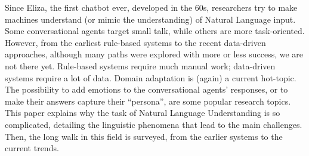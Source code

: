 
Since Eliza, the first chatbot ever, developed in the 60s, researchers try to make machines understand (or mimic the understanding) of Natural Language input. Some conversational agents target small talk, while others are more task-oriented. However, from the earliest rule-based systems to the recent data-driven approaches, although many paths were explored with more or less success, we are not there yet. Rule-based systems require much manual work; data-driven systems require a lot of data. Domain adaptation is (again) a current hot-topic. The possibility to add emotions to the conversational agents' responses, or to make their answers capture their ``persona'', are some popular research topics. 
This paper explains why the task of Natural Language Understanding is so complicated, detailing the linguistic phenomena that lead to the main challenges. Then, the long walk in this field is surveyed, from the earlier systems to the current trends.

